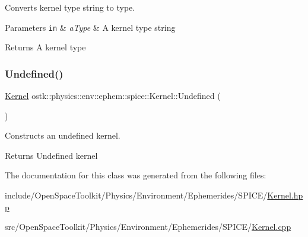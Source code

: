 Converts kernel type string to type. 


\begin{DoxyParams}[1]{Parameters}
\mbox{\tt in}  & {\em a\+Type} & A kernel type string \\
\hline
\end{DoxyParams}
\begin{DoxyReturn}{Returns}
A kernel type 
\end{DoxyReturn}
\mbox{\label{classostk_1_1physics_1_1env_1_1ephem_1_1spice_1_1_kernel_adbae01d9d825d6f3863300c19d4e9645}} 
\subsubsection{\texorpdfstring{Undefined()}{Undefined()}}
{\footnotesize\ttfamily \hyperlink{classostk_1_1physics_1_1env_1_1ephem_1_1spice_1_1_kernel}{Kernel} ostk\+::physics\+::env\+::ephem\+::spice\+::\+Kernel\+::\+Undefined (\begin{DoxyParamCaption}{ }\end{DoxyParamCaption})\hspace{0.3cm}{\ttfamily [static]}}



Constructs an undefined kernel. 

\begin{DoxyReturn}{Returns}
Undefined kernel 
\end{DoxyReturn}


The documentation for this class was generated from the following files\+:\begin{DoxyCompactItemize}
\item 
include/\+Open\+Space\+Toolkit/\+Physics/\+Environment/\+Ephemerides/\+S\+P\+I\+C\+E/\hyperlink{_kernel_8hpp}{Kernel.\+hpp}\item 
src/\+Open\+Space\+Toolkit/\+Physics/\+Environment/\+Ephemerides/\+S\+P\+I\+C\+E/\hyperlink{_kernel_8cpp}{Kernel.\+cpp}\end{DoxyCompactItemize}
